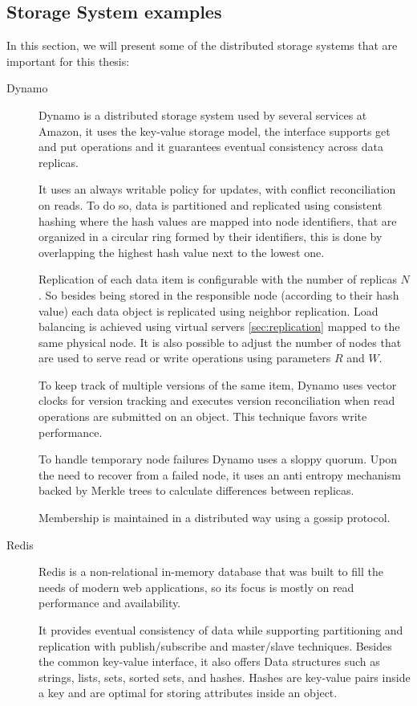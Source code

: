 \subsection{Storage System examples}
\label{sec:storage_system_examples}
In this section, we will present some of the distributed storage systems that are important for this thesis:

\begin{description}
\item[Dynamo~\cite{dynamo}] Dynamo is a distributed storage system used by several services at Amazon, it uses the key-value storage model, the interface supports get and put operations and it guarantees eventual consistency across data replicas.\par
	It uses an always writable policy for updates, with conflict reconciliation on reads. To do so, data is partitioned and replicated using consistent hashing where the hash values are mapped into node identifiers, that are organized in a circular ring formed by their identifiers, this is done by overlapping the highest hash value next to the lowest one.\par
	Replication of each data item is configurable with the number of replicas $N$. So besides being stored in the responsible node (according to their hash value) each data object is replicated using neighbor replication. Load balancing is achieved using virtual servers \ref{sec:replication} mapped to the same physical node. It is also possible to adjust the number of nodes that are used to serve read or write operations using parameters $R$ and $W$.\par
	To keep track of multiple versions of the same item, Dynamo uses vector clocks for version tracking and executes version reconciliation when read operations are submitted on an object. This technique favors write performance.\par
	To handle temporary node failures Dynamo uses a sloppy quorum. Upon the need to recover from a failed node, it uses an anti entropy mechanism backed by Merkle trees to calculate differences between replicas.\par
	Membership is maintained in a distributed way using a gossip protocol.
	
\item[Redis]\cite{redis} Redis is a non-relational in-memory database that was built to fill the needs of modern web applications, so its focus is mostly on read performance and availability.\par
	It provides eventual consistency of data while supporting partitioning and replication with publish/subscribe and master/slave techniques. Besides the common key-value interface, it also offers Data structures such as strings, lists, sets, sorted sets, and hashes. Hashes are key-value pairs inside a key and are optimal for storing attributes inside an object.


\end{description}
